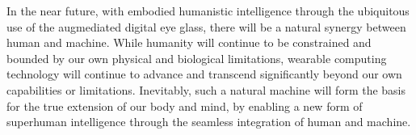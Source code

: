 In the near future, with embodied humanistic intelligence through the ubiquitous use of the augmediated digital eye glass, there will be a natural synergy between human and machine. While humanity will continue to be constrained and bounded by our own physical and biological limitations, wearable computing technology will continue to advance and transcend significantly beyond our own capabilities or limitations. Inevitably, such a natural machine will form the basis for the true extension of our body and mind, by enabling a new form of superhuman intelligence through the seamless integration of human and machine.




